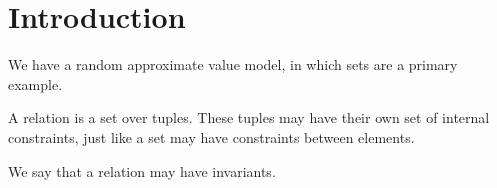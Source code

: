 \documentclass[ ../main.tex]{subfiles}
\begin{document}
\section{Introduction}
We have a random approximate value model, in which sets are a primary example.

A relation is a set over tuples.
These tuples may have their own set of internal constraints, just like a set may have constraints between elements.

We say that a relation may have invariants.








\end{document}
